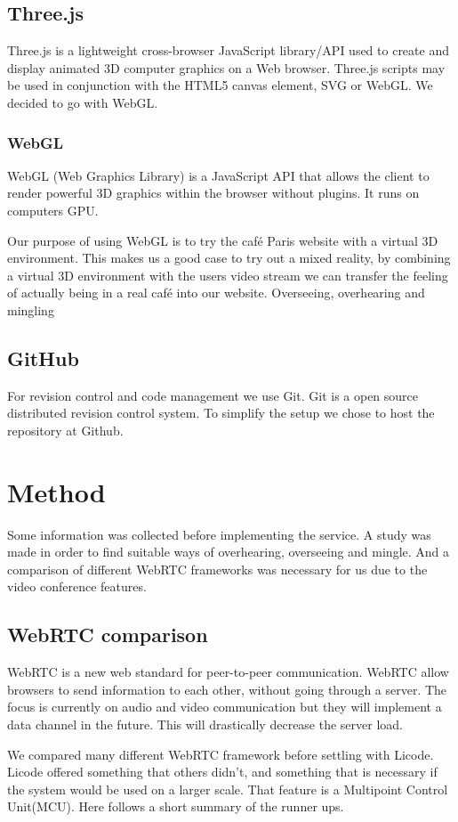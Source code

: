 \documentclass[12pt, titlepage]{article}
\begin{document}
\subsection{Three.js}
Three.js\cite{33} is a lightweight cross-browser JavaScript library/API used to create and display animated 3D computer graphics on a Web browser. Three.js scripts may be used in conjunction with the HTML5 canvas element, SVG or WebGL. We decided to go with WebGL.
\subsubsection{WebGL}
WebGL (Web Graphics Library) is a JavaScript API that allows the client to render powerful 3D graphics within the browser without plugins. It runs on computers GPU.

Our purpose of using WebGL is to try the café Paris website with a virtual 3D environment. This makes us a good case to try out a mixed reality, by combining a virtual 3D environment with the users video stream we can transfer the feeling of actually being in a real café into our website. Overseeing, overhearing and mingling
\subsection{GitHub}
For revision control and code management we use Git. Git is a open source distributed revision control system. To simplify the setup we chose to host the repository at Github\cite{34}.

\section{Method}
Some information was collected before implementing the service. A study was made in order to find suitable ways of overhearing, overseeing and mingle. And a comparison of different WebRTC frameworks was necessary for us due to the video conference features.
\subsection{WebRTC comparison}
WebRTC is a new web standard for peer-to-peer communication. WebRTC allow browsers to send information to each other, without going through a server. The focus is currently on audio and video communication but they will implement a data channel in the future. This will drastically decrease the server load.

We compared many different WebRTC framework before settling with Licode. Licode offered something that others didn't, and something that is necessary if the system would be used on a larger scale. That feature is a Multipoint Control Unit(MCU). Here follows a short summary of the runner ups.
\end{document}
